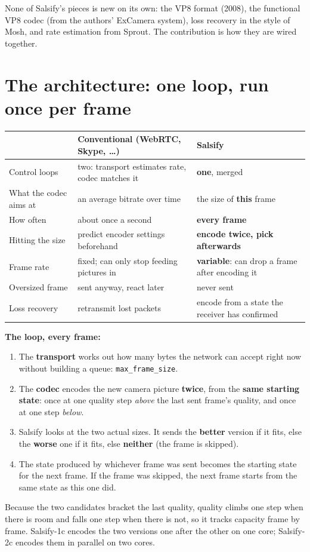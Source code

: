 None of Salsify's pieces is new on its own: the VP8 format (2008), the functional VP8 codec (from the authors' ExCamera system), loss recovery in the
style of Mosh, and rate estimation from Sprout. The contribution is how they are wired together.

\section{The architecture: one loop, run once per frame}

\begin{center}
\begin{tabularx}{\linewidth}{@{}lXX@{}}
\toprule
 & \textbf{Conventional (WebRTC, Skype, \dots)} & \textbf{Salsify}\\
\midrule
Control loops & two: transport estimates rate, codec matches it & \textbf{one}, merged\\
What the codec aims at & an average bitrate over time & the size of \textbf{this} frame\\
How often & about once a second & \textbf{every frame}\\
Hitting the size & predict encoder settings beforehand & \textbf{encode twice, pick afterwards}\\
Frame rate & fixed; can only stop feeding pictures in & \textbf{variable}: can drop a frame after encoding it\\
Oversized frame & sent anyway, react later & never sent\\
Loss recovery & retransmit lost packets & encode from a state the receiver has confirmed\\
\bottomrule
\end{tabularx}
\end{center}

\textbf{The loop, every frame:}
\begin{enumerate}
  \item The \textbf{transport} works out how many bytes the network can accept right now without building a queue: \texttt{max\_frame\_size}.
  \item The \textbf{codec} encodes the new camera picture \textbf{twice}, from the \textbf{same starting state}: once at one quality step \emph{above}
        the last sent frame's quality, and once at one step \emph{below}.
  \item Salsify looks at the two actual sizes. It sends the \textbf{better} version if it fits, else the \textbf{worse} one if it fits, else
        \textbf{neither} (the frame is skipped).
  \item The state produced by whichever frame was sent becomes the starting state for the next frame. If the frame was skipped, the next frame starts from
        the same state as this one did.
\end{enumerate}
Because the two candidates bracket the last quality, quality climbs one step when there is room and falls one step when there is not, so it tracks capacity
frame by frame. Salsify-1c encodes the two versions one after the other on one core; Salsify-2c encodes them in parallel on two cores.

